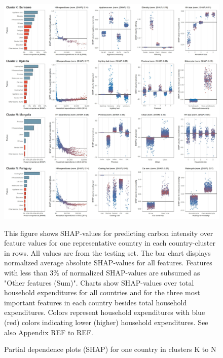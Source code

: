\documentclass[12pt, a4paper]{article}
\newenvironment{subcaption}
{\strut
\vspace{-5pt}
\begin{minipage}[b]{0.9\textwidth}
  \hspace*{-\parindent}
  \footnotesize}
 {\end{minipage}}
\begin{document}
\begin{figure}[ht!]
    \centering
    \includegraphics[width=15.5 cm]{Figure 5/Figures_joint_3}
    \caption{Partial dependence plots (SHAP) for one country in clusters K to N}
    \label{fig:fig_5_3}
    \begin{subcaption}
    This figure shows SHAP-values for predicting carbon intensity over feature values for one representative country in each country-cluster in rows. All values are from the testing set. The bar chart displays normalized average absolute SHAP-values for all features. Features with less than 3\% of normalized SHAP-values are subsumed as "Other features (Sum)". Charts show SHAP-values over total household expenditures for all countries and for the three most important features in each country besides total household expenditures. Colors represent household expenditures with blue (red) colors indicating lower (higher) household expenditures. See also Appendix REF to REF.
    \end{subcaption}
\end{figure}
\end{document}
